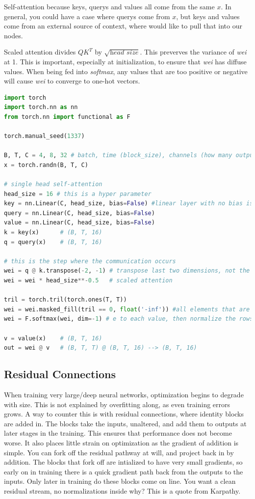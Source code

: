 \documentclass{article}
\begin{document}
Self-attention because keys, querys and values all come from the same $x$. In general, you could have a case where querys come from $x$, but keys and values come from an external source of context, where would like to pull that into our nodes.

Scaled attention divides $QK^T$ by $\sqrt{\textit{head size}}$. This preverves the variance of \emph{wei} at 1. 
This is important, especially at initialization, to ensure that \emph{wei} has diffuse values.  
When being fed into \emph{softmax}, any values that are too positive or negative will cause \emph{wei} to converge to one-hot vectors.
\begin{lstlisting}[language=Python]
import torch
import torch.nn as nn
from torch.nn import functional as F

torch.manual_seed(1337)

B, T, C = 4, 8, 32 # batch, time (block_size), channels (how many outputs)
x = torch.randn(B, T, C)

# single head self-attention
head_size = 16 # this is a hyper parameter
key = nn.Linear(C, head_size, bias=False) #linear layer with no bias is a matrix multiply with fixed weights
query = nn.Linear(C, head_size, bias=False)
value = nn.Linear(C, head_size, bias=False)
k = key(x)      # (B, T, 16)
q = query(x)    # (B, T, 16)

# this is the step where the communication occurs
wei = q @ k.transpose(-2, -1) # transpose last two dimensions, not the first (B, T, 16) @ (B, 16, T) --> (B, T, T)
wei = wei * head_size**-0.5   # scaled attention

tril = torch.tril(torch.ones(T, T))
wei = wei.masked_fill(tril == 0, float('-inf')) #all elements that are zero in tril (lower triangular) become -infinity
wei = F.softmax(wei, dim=-1) # e to each value, then normalize the rows to sum to 1

v = value(x)    # (B, T, 16)
out = wei @ v   # (B, T, T) @ (B, T, 16) --> (B, T, 16)
\end{lstlisting}

\subsection*{Residual Connections}
When training very large/deep neural networks, optimization begins to degrade with size.
This is not explained by overfitting along, as even training errors grows.
A way to counter this is with residual connections, where identity blocks are added in.
The blocks take the inputs, unaltered, and add them to outputs at later stages in the training.  
This ensures that performance does not become worse.
It also places little strain on optimization as the gradient of addition is simple.
You can fork off the residual pathway at will, and project back in by addition.
The blocks that fork off are intialized to have very small gradients, so early on in training there is a quick gradient path back from the outputs to the inputs.
Only later in training do these blocks come on line.
You want a clean residual stream, no normalizations inside {\color{mred} why? This is a quote from Karpathy}.
\end{document}
